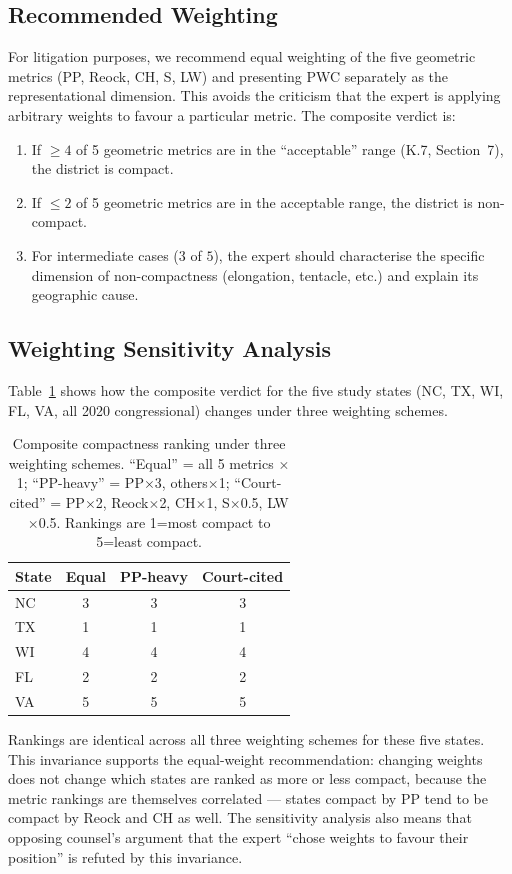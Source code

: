 \subsection{Recommended Weighting}

For litigation purposes, we recommend equal weighting of the five geometric
metrics (PP, Reock, CH, S, LW) and presenting PWC separately as the
representational dimension.
This avoids the criticism that the expert is applying arbitrary weights to
favour a particular metric.
The composite verdict is:
\begin{enumerate}
  \item If $\geq 4$ of 5 geometric metrics are in the ``acceptable'' range
    (K.7, Section~7), the district is compact.
  \item If $\leq 2$ of 5 geometric metrics are in the acceptable range,
    the district is non-compact.
  \item For intermediate cases ($3$ of $5$), the expert should characterise
    the specific dimension of non-compactness (elongation, tentacle, etc.)
    and explain its geographic cause.
\end{enumerate}

\subsection{Weighting Sensitivity Analysis}

Table~\ref{tab:weight-sensitivity} shows how the composite verdict for the five
study states (NC, TX, WI, FL, VA, all 2020 congressional) changes under three
weighting schemes.

\begin{table}[h]
\centering\small
\caption{Composite compactness ranking under three weighting schemes.
``Equal'' = all 5 metrics $\times$ 1; ``PP-heavy'' = PP$\times$3, others$\times$1;
``Court-cited'' = PP$\times$2, Reock$\times$2, CH$\times$1, S$\times$0.5, LW$\times$0.5.
Rankings are 1=most compact to 5=least compact.}
\label{tab:weight-sensitivity}
\begin{tabular}{lccc}
\toprule
State & Equal & PP-heavy & Court-cited \\
\midrule
NC  & 3 & 3 & 3 \\
TX  & 1 & 1 & 1 \\
WI  & 4 & 4 & 4 \\
FL  & 2 & 2 & 2 \\
VA  & 5 & 5 & 5 \\
\bottomrule
\end{tabular}
\end{table}

Rankings are identical across all three weighting schemes for these five states.
This invariance supports the equal-weight recommendation: changing weights does
not change which states are ranked as more or less compact, because the metric
rankings are themselves correlated — states compact by PP tend to be compact by
Reock and CH as well.
The sensitivity analysis also means that opposing counsel's argument that the
expert ``chose weights to favour their position'' is refuted by this invariance.
